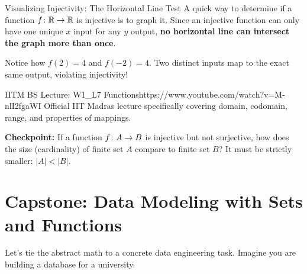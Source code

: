 \begin{intuitionbox}{Visualizing Injectivity: The Horizontal Line Test}
A quick way to determine if a function $f \colon \mathbb{R} \to \mathbb{R}$ is injective is to graph it. Since an injective function can only have one unique $x$ input for any $y$ output, \textbf{no horizontal line can intersect the graph more than once}.
\begin{center}
\end{center}
Notice how $f(2) = 4$ and $f(-2) = 4$. Two distinct inputs map to the exact same output, violating injectivity!
\end{intuitionbox}

\begin{videocard}{IITM BS Lecture: W1\_L7 Functions}{https://www.youtube.com/watch?v=M-nlI2fgaWI}
Official IIT Madras lecture specifically covering domain, codomain, range, and properties of mappings.
\end{videocard}

\vspace{0.3cm}
\textbf{Checkpoint:} If a function $f \colon A \to B$ is injective but not surjective, how does the size (cardinality) of finite set $A$ compare to finite set $B$? It must be strictly smaller: $|A| < |B|$.
\vspace{0.3cm}

\section{Capstone: Data Modeling with Sets and Functions}

Let's tie the abstract math to a concrete data engineering task. Imagine you are building a database for a university. 

